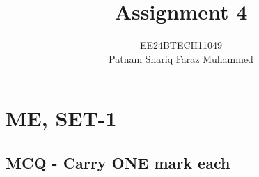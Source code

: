 \documentclass[journal]{IEEEtran}
\numberwithin{equation}{enumi}
\numberwithin{figure}{enumi}
\begin{document}


\title{Assignment 4}
\author{EE24BTECH11049 \\ Patnam Shariq Faraz Muhammed}

{\let\newpage\relax\maketitle}
\section{ME, SET-1}
\subsection{MCQ - Carry ONE mark each}
\end{document}
